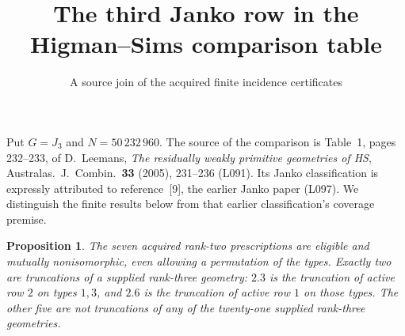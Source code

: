 \documentclass[11pt]{article}
\title{The third Janko row in the Higman--Sims comparison table}
\author{A source join of the acquired finite incidence certificates}\date{}
\newtheorem{proposition}{Proposition}
\begin{document}
\maketitle
Put $G=J_3$ and $N=50\,232\,960$. The source of the comparison is
Table~1, pages 232--233, of D.~Leemans, \emph{The residually weakly
primitive geometries of HS}, Australas.\ J.\ Combin.\ \textbf{33} (2005),
231--236 (L091). Its Janko classification is expressly attributed to
reference~[9], the earlier Janko paper (L097). We distinguish the finite
results below from that earlier classification's coverage premise.

\begin{proposition}
The seven acquired rank-two prescriptions are eligible and mutually
nonisomorphic, even allowing a permutation of the types. Exactly two
are truncations of a supplied rank-three geometry: $2.3$ is the
truncation of active row $2$ on types $1,3$, and $2.6$ is the truncation
of active row $1$ on those types. The other five are not truncations of
any of the twenty-one supplied rank-three geometries.
\end{proposition}
\end{document}
